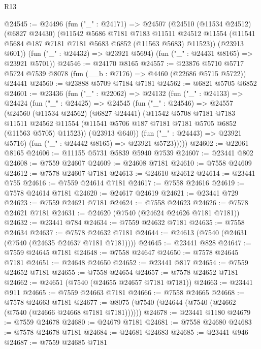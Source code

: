 \begin{lexlean}{R13}
\begin{coremodule}
@24545 := @24496
    (fun ("_" : @24171) =>
    @24507
      (@24510
        (@11534 @24512)
        (@6827 @24430)
        (@11542
          @5686
          @7181
          @7183
          @11511
          @24512
          @11554
          (@11541 @5684 @187 @7181 @7181 @5683 @6852 (@11563 @5683) @11523))
        (@23913 @601))
      (fun ("_" : @24432) => @23921 @5694)
      (fun ("_" : @24431 @8165) => @23921 @5701))
@24546 := @24170 @8165
@24557 := @23876
    @5710
    @5717
    @5724
    @7539
    @8078
    (fun (__b : @7176) => @4460 (@22686 @5715 @5722))
    @24441
@24560 := @23888 @5709 @7184 @7181
@24562 := @6821 @5705 @6852
@24601 := @23436
    (fun ("_" : @22062) =>
    @24132
      (fun ("_" : @24133) =>
      @24424
        (fun ("_" : @24425) =>
        @24545
          (fun ("_" : @24546) =>
          @24557
            (@24560
              (@11534 @24562)
              (@6827 @24441)
              (@11542
                @5708
                @7181
                @7183
                @11511
                @24562
                @11554
                (@11541 @5706 @187 @7181 @7181 @5705 @6852 (@11563 @5705) @11523))
              (@23913 @640))
            (fun ("_" : @24443) => @23921 @5716)
            (fun ("_" : @24442 @8165) => @23921 @5723)))))
@24602 := @22061 @8165
@24606 := @11155 @5731 @5839 @5940 @7539
@24607 := @23441 @802
@24608 := @7559 @24607
@24609 := @24608 @7181
@24610 := @7558 @24609
@24612 := @7578 @24607 @7181
@24613 := @24610 @24612
@24614 := @23441 @755
@24616 := @7559 @24614 @7181
@24617 := @7558 @24616
@24619 := @7578 @24614 @7181
@24620 := @24617 @24619
@24621 := @23441 @729
@24623 := @7559 @24621 @7181
@24624 := @7558 @24623
@24626 := @7578 @24621 @7181
@24631 := @24620 (@7540 (@24624 @24626 @7181 @7181))
@24632 := @23441 @784
@24634 := @7559 @24632 @7181
@24635 := @7558 @24634
@24637 := @7578 @24632 @7181
@24644 := @24613 (@7540 (@24631 (@7540 (@24635 @24637 @7181 @7181))))
@24645 := @23441 @828
@24647 := @7559 @24645 @7181
@24648 := @7558 @24647
@24650 := @7578 @24645 @7181
@24651 := @24648 @24650
@24652 := @23441 @817
@24654 := @7559 @24652 @7181
@24655 := @7558 @24654
@24657 := @7578 @24652 @7181
@24662 := @24651 (@7540 (@24655 @24657 @7181 @7181))
@24663 := @23441 @911
@24665 := @7559 @24663 @7181
@24666 := @7558 @24665
@24668 := @7578 @24663 @7181
@24677 := @8075 (@7540 (@24644 (@7540 (@24662 (@7540 (@24666 @24668 @7181 @7181))))))
@24678 := @23441 @1180
@24679 := @7559 @24678
@24680 := @24679 @7181
@24681 := @7558 @24680
@24683 := @7578 @24678 @7181
@24684 := @24681 @24683
@24685 := @23441 @946
@24687 := @7559 @24685 @7181

\end{coremodule}
\end{lexlean}

